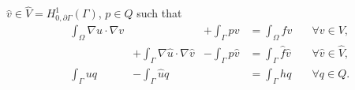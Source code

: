 \documentclass[r]{siamart171218}
\begin{document}
$\hat{v}\in\hat{V}=H^1_{0, \partial\Gamma}(\Gamma)$, $p\in Q$ such that
%
\begin{equation}\label{eq:coupled_weak}
  \begin{aligned}
    &\int_{\Omega}\nabla u\cdot \nabla v &\phantom{+\int_{\Gamma}\nabla \hat{u}\cdot \nabla \hat{v}} &+\int_{\Gamma} p v &= \int_{\Omega}f v \quad &\forall v\in V,\\
    &\phantom{\int_{\Omega}\nabla u\cdot \nabla v} &+{\int_{\Gamma}\nabla \hat{u}\cdot \nabla \hat{v}} &-\int_{\Gamma} p\hat{v} &= \int_{\Gamma}\hat{f}\hat{v} \quad &\forall \hat{v}\in \hat{V},\\
    &\int_{\Gamma}u q &-\int_{\Gamma}\hat{u}q &\phantom{-\int{\Gamma}q\hat{v}} &= \int_{\Gamma}h q \quad &\forall q\in Q.
  \end{aligned}
\end{equation}
%
\end{document}
